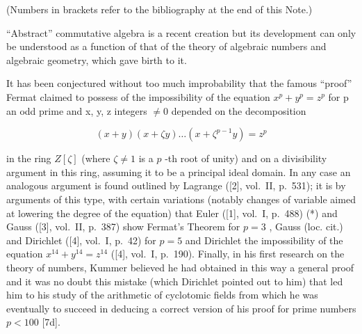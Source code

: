 
(Numbers in brackets refer to the bibliography at the end of this Note.)

``Abstract'' commutative algebra is a recent creation but its development can only be understood as a function of that of the theory of algebraic numbers and algebraic geometry, which gave birth to it.

It has been conjectured without too much improbability that the famous ``proof'' Fermat claimed to possess of the impossibility of the equation \(x^{p} + y^{p} = z^{p}\) for p an odd prime and x, y, z integers \(\neq 0\) depended on the decomposition

\[
(x + y) (x + \zeta y) \dots (x + \zeta^ {p - 1} y) = z ^ {p}
\]

in the ring \(Z[\zeta]\) (where \(\zeta \neq 1\) is a \(p\) -th root of unity) and on a divisibility argument in this ring, assuming it to be a principal ideal domain. In any case an analogous argument is found outlined by Lagrange ({[}2{]}, vol.~II, p.~531); it is by arguments of this type, with certain variations (notably changes of variable aimed at lowering the degree of the equation) that Euler ({[}1{]}, vol.~I, p.~488) (*) and Gauss ({[}3{]}, vol.~II, p.~387) show Fermat's Theorem for \(p = 3\) , Gauss (loc. cit.) and Dirichlet ({[}4{]}, vol.~I, p.~42) for \(p = 5\) and Dirichlet the impossibility of the equation \(x^{14} + y^{14} = z^{14}\) ({[}4{]}, vol.~I, p.~190). Finally, in his first research on the theory of numbers, Kummer believed he had obtained in this way a general proof and it was no doubt this mistake (which Dirichlet pointed out to him) that led him to his study of the arithmetic of cyclotomic fields from which he was eventually to succeed in deducing a correct version of his proof for prime numbers \(p < 100\) {[}7d{]}.


